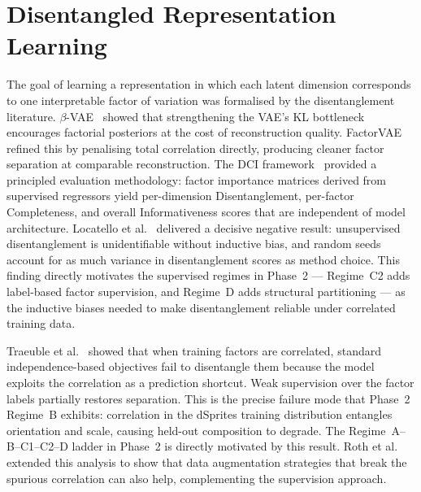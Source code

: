 
\section{Disentangled Representation Learning}
\label{sec:rw_disentanglement}

The goal of learning a representation in which each latent dimension corresponds to one
interpretable factor of variation was formalised by the disentanglement literature.
$\beta$-VAE~\citep{Higgins2016betaVAELB} showed that strengthening the VAE's KL bottleneck
encourages factorial posteriors at the cost of reconstruction quality. FactorVAE~\citep{disentangling_by_factorising}
refined this by penalising total correlation directly, producing cleaner factor separation
at comparable reconstruction. The DCI framework~\citep{eastwood2018framework} provided a
principled evaluation methodology: factor importance matrices derived from supervised
regressors yield per-dimension Disentanglement, per-factor Completeness, and overall
Informativeness scores that are independent of model architecture. Locatello et
al.~\citep{locatello2019challenging} delivered a decisive negative result: unsupervised
disentanglement is unidentifiable without inductive bias, and random seeds account for as
much variance in disentanglement scores as method choice. This finding directly motivates
the supervised regimes in Phase~2 --- Regime~C2 adds label-based factor supervision, and
Regime~D adds structural partitioning --- as the inductive biases needed to make
disentanglement reliable under correlated training data.

Traeuble et al.~\citep{traeuble2021disentangled} showed that when training factors are
correlated, standard independence-based objectives fail to disentangle them because the
model exploits the correlation as a prediction shortcut. Weak supervision over the factor
labels partially restores separation. This is the precise failure mode that Phase~2
Regime~B exhibits: correlation in the dSprites training distribution entangles orientation
and scale, causing held-out composition to degrade. The Regime~A--B--C1--C2--D ladder
in Phase~2 is directly motivated by this result. Roth et al.~\citep{roth2023disentanglement}
extended this analysis to show that data augmentation strategies that break the spurious
correlation can also help, complementing the supervision approach.

